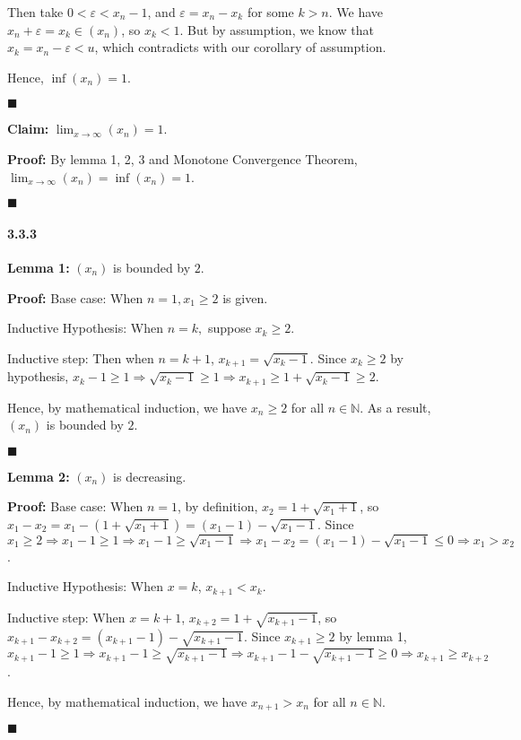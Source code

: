 \documentclass[11pt]{article}
\newcommand{\qed}{\begin{flushright}
					$\blacksquare$
				  \end{flushright}}
\begin{document}
			Then take $0 < \varepsilon < x_n - 1$, and $\varepsilon = x_n - x_k$ for some $k > n$. We have $x_n + \varepsilon = x_k \in (x_n)$, so $x_k < 1$. But by assumption, we know that $x_k = x_n - \varepsilon < u$, which contradicts with our corollary of assumption.
			
			Hence, $\inf(x_n) = 1$.
			\qed
			
			\textbf{Claim:} $\lim_{x \rightarrow \infty} (x_n) = 1$.
			
			\textbf{Proof:} By lemma 1, 2, 3 and Monotone Convergence Theorem, $\lim_{x \rightarrow \infty} (x_n) = \inf(x_n) = 1$.
			\qed 
	\paragraph{3.3.3}
		\textbf{Lemma 1:} $(x_n)$ is bounded by $2$.
		
		\textbf{Proof:} Base case: When $n = 1, x_1 \geq 2$ is given.
		
		Inductive Hypothesis: When $n = k,$ suppose $x_k \geq 2$.
		
		Inductive step: Then when $n = k + 1$, $x_{k + 1} = \sqrt{x_k - 1}$. Since $x_k \geq 2$ by hypothesis, $x_k - 1 \geq 1 \Rightarrow \sqrt{x_k - 1} \geq 1 \Rightarrow x_{k + 1} \geq 1 + \sqrt{x_k - 1} \geq 2$.
		
		Hence, by mathematical induction, we have $x_n \geq 2$ for all $n \in \mathbb{N}$. As a result, $(x_n)$ is bounded by $2$.
		\qed
		
		\textbf{Lemma 2:} $(x_n)$ is decreasing.
		
		\textbf{Proof:} Base case: When $n = 1$, by definition, $x_2 = 1 + \sqrt{x_1 + 1}$, so $x_1 - x_2 = x_1 - (1 + \sqrt{x_1 + 1}) = (x_1 - 1) - \sqrt{x_1 - 1}$. Since $x_1 \geq 2 \Rightarrow x_1 - 1\geq 1 \Rightarrow x_1 - 1 \geq \sqrt{x_1 - 1} \Rightarrow x_1 - x_2 = (x_1 - 1) - \sqrt{x_1 - 1} \leq 0 \Rightarrow x_1 > x_2$.
		
		Inductive Hypothesis: When $x = k$, $x_{k + 1} < x_k$.
		
		Inductive step: When $x = k + 1$, $x_{k + 2} = 1 + \sqrt{x_{k + 1} - 1}$, so $x_{k + 1} - x_{k + 2} = (x_{k + 1} - 1) - \sqrt{x_{k + 1} - 1}$. Since $x_{k + 1} \geq 2$ by lemma 1, $x_{k + 1} - 1 \geq 1 \Rightarrow x_{k + 1} - 1 \geq \sqrt{x_{k + 1} - 1} \Rightarrow x_{k + 1} - 1 - \sqrt{x_{k + 1} - 1} \geq 0 \Rightarrow x_{k + 1} \geq x_{k + 2}$.
		
		Hence, by mathematical induction, we have $x_{n + 1} > x_n$ for all $n \in \mathbb{N}$.
		\qed
		
\end{document}
